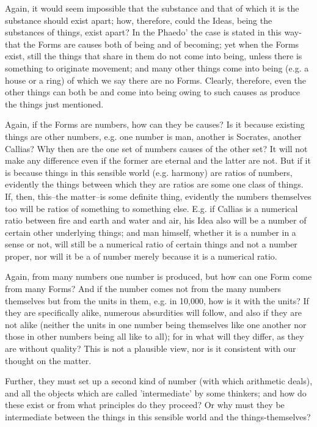 \documentclass[oneside, 17pt, dvipsnames]{extbook}
\begin{document}
Again, it would seem impossible that the substance and that of which it is the substance should exist apart; how, therefore, could the Ideas, being the substances of things, exist apart? In the Phaedo' the case is stated in this way-that the Forms are causes both of being and of becoming; yet when the Forms exist, still the things that share in them do not come into being, unless there is something to originate movement; and many other things come into being (e.g. a house or a ring) of which we say there are no Forms. Clearly, therefore, even the other things can both be and come into being owing to such causes as produce the things just mentioned.

Again, if the Forms are numbers, how can they be causes? Is it because existing things are other numbers, e.g. one number is man, another is Socrates, another Callias? Why then are the one set of numbers causes of the other set? It will not make any difference even if the former are eternal and the latter are not. But if it is because things in this sensible world (e.g. harmony) are ratios of numbers, evidently the things between which they are ratios are some one class of things. If, then, this--the matter--is some definite thing, evidently the numbers themselves too will be ratios of something to something else. E.g. if Callias is a numerical ratio between fire and earth and water and air, his Idea also will be a number of certain other underlying things; and man himself, whether it is a number in a sense or not, will still be a numerical ratio of certain things and not a number proper, nor will it be a of number merely because it is a numerical ratio.

Again, from many numbers one number is produced, but how can one Form come from many Forms? And if the number comes not from the many numbers themselves but from the units in them, e.g. in 10,000, how is it with the units? If they are specifically alike, numerous absurdities will follow, and also if they are not alike (neither the units in one number being themselves like one another nor those in other numbers being all like to all); for in what will they differ, as they are without quality? This is not a plausible view, nor is it consistent with our thought on the matter.

Further, they must set up a second kind of number (with which arithmetic deals), and all the objects which are called 'intermediate' by some thinkers; and how do these exist or from what principles do they proceed? Or why must they be intermediate between the things in this sensible world and the things-themselves?
\end{document}
